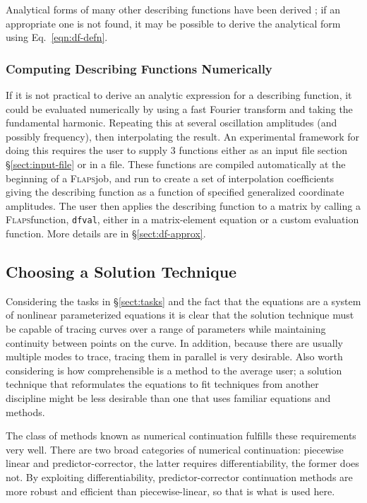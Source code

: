 \documentclass[11pt,openany,twoside]{book}
\numberwithin{equation}{section}		%
\newcommand{\Code}[1]{{\small\tt #1}}
\newcommand{\Flaps}{\textsc{Flaps\:}}
\newcommand{\Sectref}[1]{\S\ref{#1}}
\newcommand{\Eqn}[1]{Eq.\ \ref{#1}}  %
\begin{document}
Analytical forms of many other describing functions have been 
derived \cite{gelb1968multiple}; if an appropriate one is not
found, it may be possible to derive the analytical form using
\Eqn{eqn:df-defn}.

\subsubsection{Computing Describing Functions Numerically}
\label{sect:computing-df}
If it is not practical to derive an analytic expression for a
describing function, it could be evaluated numerically by using
a fast Fourier transform and taking the fundamental harmonic.
Repeating this at several oscillation amplitudes (and possibly
frequency), then interpolating the result.
An experimental framework for doing this requires the user to supply
3 functions either as an input file section \Sectref{sect:input-file} or
in a file. These functions are compiled automatically at the beginning
of a \Flaps job, and run to create a set of interpolation coefficients
giving the describing function as a function of specified generalized
coordinate amplitudes. The user then applies the describing function
to a matrix by calling a \Flaps function, \Code{dfval}, either in
a matrix-element equation or a custom evaluation function.
More details are in \Sectref{sect:df-approx}.

\subsection{Choosing a Solution Technique}\label{sect:soln-req}
Considering the tasks in \Sectref{sect:tasks} and the fact that the equations
are a system of nonlinear parameterized equations it is clear that the solution
technique must be capable of tracing curves over a range of parameters
while maintaining continuity between points on the curve.
In addition, because there are usually multiple modes to trace, tracing them
in parallel is very desirable.
Also worth considering is how comprehensible is a method to the average user;
a solution technique that reformulates the equations to fit techniques from
another discipline might be less desirable than one that uses familiar equations
and methods.

The class of methods known as numerical continuation fulfills these requirements very well.
There are two broad categories of numerical continuation:
piecewise linear and predictor-corrector, the latter requires differentiability,
the former does not. By exploiting differentiability, predictor-corrector
continuation methods are more robust and efficient than piecewise-linear, so
that is what is used here.
\end{document}

